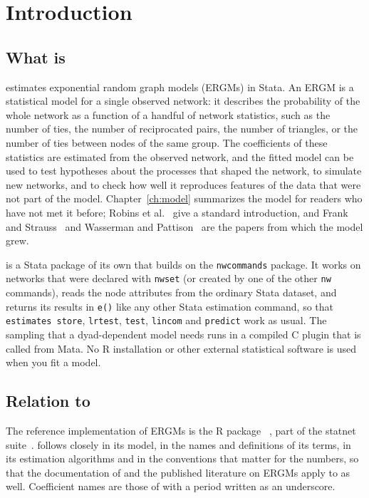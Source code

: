 \chapter{Introduction}\label{ch:intro}

\section{What \texorpdfstring{\nwergm}{nwergm} is}

\nwergm{} estimates exponential random graph models (ERGMs) in Stata. An ERGM is a statistical model for a single observed network: it describes the probability of the whole network as a function of a handful of network statistics, such as the number of ties, the number of reciprocated pairs, the number of triangles, or the number of ties between nodes of the same group. The coefficients of these statistics are estimated from the observed network, and the fitted model can be used to test hypotheses about the processes that shaped the network, to simulate new networks, and to check how well it reproduces features of the data that were not part of the model. Chapter~\ref{ch:model} summarizes the model for readers who have not met it before; Robins et al.~\cite{robins2007} give a standard introduction, and Frank and Strauss~\cite{frank1986} and Wasserman and Pattison~\cite{wasserman1996} are the papers from which the model grew.

\nwergm{} is a Stata package of its own that builds on the \texttt{nwcommands} package. It works on networks that were declared with \texttt{nwset} (or created by one of the other \texttt{nw} commands), reads the node attributes from the ordinary Stata dataset, and returns its results in \texttt{e()} like any other Stata estimation command, so that \texttt{estimates store}, \texttt{lrtest}, \texttt{test}, \texttt{lincom} and \texttt{predict} work as usual. The sampling that a dyad-dependent model needs runs in a compiled C plugin that is called from Mata. No R installation or other external statistical software is used when you fit a model.

\section{Relation to \texorpdfstring{\ergm}{ergm}}

The reference implementation of ERGMs is the R package \ergm{}~\cite{hunter2008jss}, part of the statnet suite~\cite{handcock2008}. \nwergm{} follows \ergm{} closely in its model, in the names and definitions of its terms, in its estimation algorithms and in the conventions that matter for the numbers, so that the documentation of \ergm{} and the published literature on ERGMs apply to \nwergm{} as well. Coefficient names are those of \ergm{} with a period written as an underscore.


